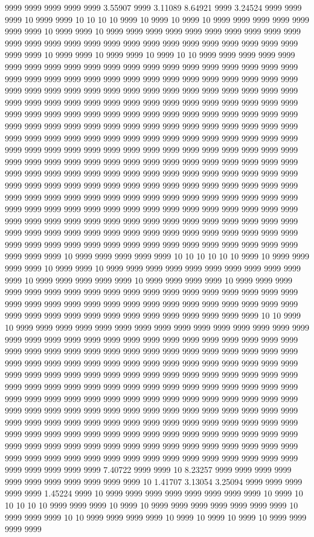 9999 9999 9999 9999 9999 3.55907 9999 3.11089 8.64921 9999 3.24524 9999 9999 9999 10 9999 9999 10 10 10 10 9999 10 9999 10 9999 10 9999 9999 9999 9999 9999 9999 9999 10 9999 9999 10 9999 9999 9999 9999 9999 9999 9999 9999 9999 9999 9999 9999 9999 9999 9999 9999 9999 9999 9999 9999 9999 9999 9999 9999 9999 9999 9999 10 9999 9999 10 9999 9999 10 9999 10 10 9999 9999 9999 9999 9999 9999 9999 9999 9999 9999 9999 9999 9999 9999 9999 9999 9999 9999 9999 9999 9999 9999 9999 9999 9999 9999 9999 9999 9999 9999 9999 9999 9999 9999 9999 9999 9999 9999 9999 9999 9999 9999 9999 9999 9999 9999 9999 9999 9999 9999 9999 9999 9999 9999 9999 9999 9999 9999 9999 9999 9999 9999 9999 9999 9999 9999 9999 9999 9999 9999 9999 9999 9999 9999 9999 9999 9999 9999 9999 9999 9999 9999 9999 9999 9999 9999 9999 9999 9999 9999 9999 9999 9999 9999 9999 9999 9999 9999 9999 9999 9999 9999 9999 9999 9999 9999 9999 9999 9999 9999 9999 9999 9999 9999 9999 9999 9999 9999 9999 9999 9999 9999 9999 9999 9999 9999 9999 9999 9999 9999 9999 9999 9999 9999 9999 9999 9999 9999 9999 9999 9999 9999 9999 9999 9999 9999 9999 9999 9999 9999 9999 9999 9999 9999 9999 9999 9999 9999 9999 9999 9999 9999 9999 9999 9999 9999 9999 9999 9999 9999 9999 9999 9999 9999 9999 9999 9999 9999 9999 9999 9999 9999 9999 9999 9999 9999 9999 9999 9999 9999 9999 9999 9999 9999 9999 9999 9999 9999 9999 9999 9999 9999 9999 9999 9999 9999 9999 9999 9999 9999 9999 9999 9999 9999 9999 9999 9999 9999 9999 9999 9999 9999 9999 9999 9999 9999 9999 9999 9999 9999 9999 9999 9999 9999 9999 9999 9999 9999 9999 9999 9999 9999 9999 9999 9999 9999 9999 9999 10 9999 9999 9999 9999 9999 10 10 10 10 10 10 9999 10 9999 9999 9999 9999 10 9999 9999 10 9999 9999 9999 9999 9999 9999 9999 9999 9999 9999 9999 10 9999 9999 9999 9999 9999 10 9999 9999 9999 9999 10 9999 9999 9999 9999 9999 9999 9999 9999 9999 9999 9999 9999 9999 9999 9999 9999 9999 9999 9999 9999 9999 9999 9999 9999 9999 9999 9999 9999 9999 9999 9999 9999 9999 9999 9999 9999 9999 9999 9999 9999 9999 9999 9999 9999 9999 9999 10 10 9999 10 9999 9999 9999 9999 9999 9999 9999 9999 9999 9999 9999 9999 9999 9999 9999 9999 9999 9999 9999 9999 9999 9999 9999 9999 9999 9999 9999 9999 9999 9999 9999 9999 9999 9999 9999 9999 9999 9999 9999 9999 9999 9999 9999 9999 9999 9999 9999 9999 9999 9999 9999 9999 9999 9999 9999 9999 9999 9999 9999 9999 9999 9999 9999 9999 9999 9999 9999 9999 9999 9999 9999 9999 9999 9999 9999 9999 9999 9999 9999 9999 9999 9999 9999 9999 9999 9999 9999 9999 9999 9999 9999 9999 9999 9999 9999 9999 9999 9999 9999 9999 9999 9999 9999 9999 9999 9999 9999 9999 9999 9999 9999 9999 9999 9999 9999 9999 9999 9999 9999 9999 9999 9999 9999 9999 9999 9999 9999 9999 9999 9999 9999 9999 9999 9999 9999 9999 9999 9999 9999 9999 9999 9999 9999 9999 9999 9999 9999 9999 9999 9999 9999 9999 9999 9999 9999 9999 9999 9999 9999 9999 9999 9999 9999 9999 9999 9999 9999 9999 9999 9999 9999 9999 9999 9999 9999 9999 9999 9999 9999 9999 9999 9999 9999 9999 9999 7.40722 9999 9999 10 8.23257 9999 9999 9999 9999 9999 9999 9999 9999 9999 9999 9999 10 1.41707 3.13054 3.25094 9999 9999 9999 9999 9999 1.45224 9999 10 9999 9999 9999 9999 9999 9999 9999 9999 10 9999 10 10 10 10 10 9999 9999 9999 10 9999 10 9999 9999 9999 9999 9999 9999 9999 10 9999 9999 9999 10 10 9999 9999 9999 9999 10 9999 10 9999 10 9999 10 9999 9999 9999 9999 